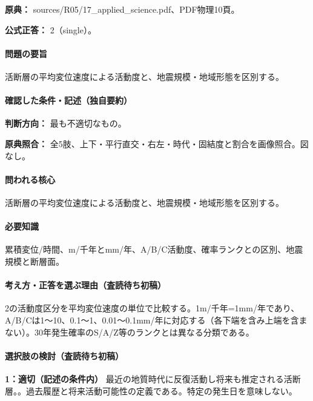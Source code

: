 \noindent\textbf{原典：} sources/R05/17\_applied\_science.pdf、PDF物理10頁。

\textbf{公式正答：} 2（single）。

\paragraph{問題の要旨} 活断層の平均変位速度による活動度と、地震規模・地域形態を区別する。

\paragraph{確認した条件・記述（独自要約）}\mbox{}\par

\noindent\textbf{判断方向：} 最も不適切なもの。\par

\noindent\textbf{原典照合：} 全5肢、上下・平行直交・右左・時代・固結度と割合を画像照合。図なし。\par

\paragraph{問われる核心} 活断層の平均変位速度による活動度と、地震規模・地域形態を区別する。

\paragraph{必要知識} 累積変位/時間、m/千年とmm/年、A/B/C活動度、確率ランクとの区別、地震規模と断層面。

\paragraph{考え方・正答を選ぶ理由（査読待ち初稿）} 2の活動度区分を平均変位速度の単位で比較する。1m/千年=1mm/年であり、A/B/Cは1〜10、0.1〜1、0.01〜0.1mm/年に対応する（各下端を含み上端を含まない）。30年発生確率のS/A/Z等のランクとは異なる分類である。

\paragraph{選択肢の検討（査読待ち初稿）}\mbox{}\par

\noindent\textbf{1：適切（記述の条件内）} 最近の地質時代に反復活動し将来も推定される活断層。。過去履歴と将来活動可能性の定義である。特定の発生日を意味しない。\par

